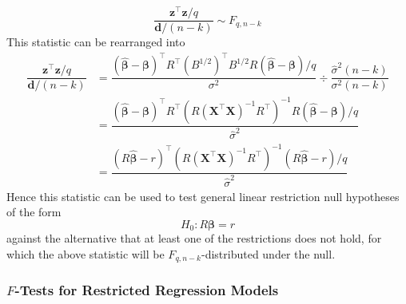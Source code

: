 \documentclass[11pt]{report} %
\begin{document}
\begin{equation}
\dfrac{\mathbf{z}^{\top}\mathbf{z}/q}{\mathbf{d}/\left(n - k\right)} \sim F_{q, n- k}
\end{equation}
This statistic can be rearranged into
\begin{align}
\dfrac{\mathbf{z}^{\top}\mathbf{z}/q}{\mathbf{d}/\left(n - k\right)} &= \dfrac{\left(\widehat{\boldsymbol{\beta}} - \boldsymbol{\beta}\right)^{\top}R^{\top}\left(B^{1/2}\right)^{\top}B^{1/2}R\left(\widehat{\boldsymbol{\beta}} - \boldsymbol{\beta}\right)/q}{\sigma^{2}}\div \dfrac{\widehat{\sigma}^{2}\left(n - k\right)}{\sigma^{2}\left(n - k\right)} \\
&= \dfrac{\left(\widehat{\boldsymbol{\beta}} - \boldsymbol{\beta}\right)^{\top}R^{\top}\left( R\left(\mathbf{X}^{\top}\mathbf{X}\right)^{-1}R^{\top}\right)^{-1}R\left(\widehat{\boldsymbol{\beta}} - \boldsymbol{\beta}\right)/q}{\widehat{\sigma}^{2}} \\
&= \dfrac{\left(R\widehat{\boldsymbol{\beta}} - r\right)^{\top}\left(R\left(\mathbf{X}^{\top}\mathbf{X}\right)^{-1}R^{\top}\right)^{-1}\left(R\widehat{\boldsymbol{\beta}} - r\right)/q}{\widehat{\sigma}^{2}}
\end{align}
Hence this statistic can be used to test general linear restriction null hypotheses of the form
\begin{equation}
H_{0}: R\boldsymbol{\beta} = r
\end{equation}
against the alternative that at least one of the restrictions does not hold, for which the above statistic will be $F_{q, n - k}$-distributed under the null.

\subsubsection{$F$-Tests for Restricted Regression Models}
\end{document}
